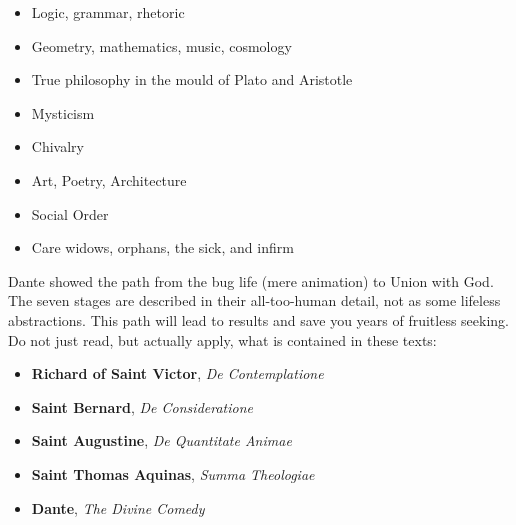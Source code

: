 \begin{itemize}
\item Logic, grammar, rhetoric 
\item Geometry, mathematics, music, cosmology 
\item True philosophy in the mould of Plato and Aristotle 
\item Mysticism 
\item Chivalry 
\item Art, Poetry, Architecture 
\item Social Order 
\item Care widows, orphans, the sick, and infirm 
\end{itemize}
Dante showed the path from the bug life (mere animation) to Union with God. The seven stages are described in their all-too-human detail, not as some lifeless abstractions. This path will lead to results and save you years of fruitless seeking. Do not just read, but actually apply, what is contained in these texts:

\begin{itemize}
\item \textbf{Richard of Saint Victor}, \emph{De Contemplatione} 
\item \textbf{Saint Bernard}, \emph{De Consideratione} 
\item \textbf{Saint Augustine}, \emph{De Quantitate Animae} 
\item \textbf{Saint Thomas Aquinas}, \emph{Summa Theologiae} 
\item \textbf{Dante}, \emph{The Divine Comedy} 
\end{itemize}


